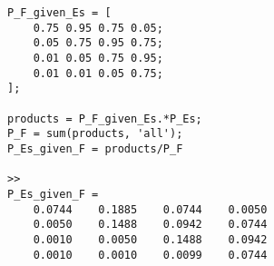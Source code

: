 \documentclass{oxmathproblems}
\begin{document}
\begin{questions}
\begin{verbatim}
P_F_given_Es = [
    0.75 0.95 0.75 0.05;
    0.05 0.75 0.95 0.75;
    0.01 0.05 0.75 0.95;
    0.01 0.01 0.05 0.75;
];

products = P_F_given_Es.*P_Es;
P_F = sum(products, 'all');
P_Es_given_F = products/P_F

>>
P_Es_given_F =
    0.0744    0.1885    0.0744    0.0050
    0.0050    0.1488    0.0942    0.0744
    0.0010    0.0050    0.1488    0.0942
    0.0010    0.0010    0.0099    0.0744
\end{verbatim}

\end{questions}
\end{document}
